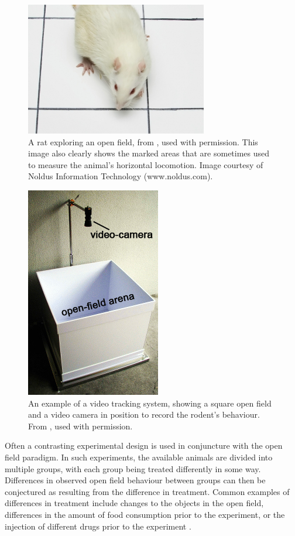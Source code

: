 \documentclass[conference,a4paper,twoside]{IEEEtran}
\begin{document}
\begin{figure}
    \centering
    \includegraphics[width=0.45\linewidth]{images/rat.jpg}
    \caption{A rat exploring an open field, from \cite{noldus}, used with permission. This image also clearly shows the marked areas that are sometimes used to measure the animal's horizontal locomotion. \small{Image courtesy of Noldus Information Technology (www.noldus.com).}}
    \label{fig:rat}
\end{figure}

\begin{figure}
    \centering
    \includegraphics[width=0.45\linewidth]{images/openfield_camera.jpg}
    \caption{An example of a video tracking system, showing a square open field and a video camera in position to record the rodent's behaviour. From \cite{koide}, used with permission.}
    \label{fig:openfield_camera}
\end{figure}

Often a contrasting experimental design is used in conjuncture with the open field paradigm. In such experiments, the available animals are divided into multiple groups, with each group being treated differently in some way. Differences in observed open field behaviour between groups can then be conjectured as resulting from the difference in treatment. Common examples of differences in treatment include changes to the objects in the open field, differences in the amount of food consumption prior to the experiment, or the injection of different drugs prior to the experiment \cite{heiderstadt2000effect}.
\end{document}
